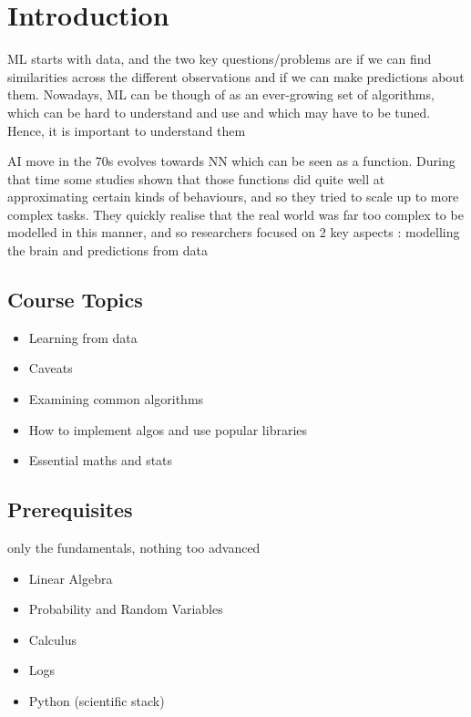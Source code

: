 \section{Introduction}



\par{ML starts with data, and the two key questions/problems are if we can find similarities across the different observations and if we can make predictions about them. Nowadays, ML can be though of as an ever-growing set of algorithms, which can be hard to understand and use and which may have to be tuned. Hence, it is important to understand them}

\par{AI move in the 70s evolves towards NN which can be seen as a function. During that time some studies shown that those functions did quite well at approximating certain kinds of behaviours, and so they tried to scale up to more complex tasks. They quickly realise that the real world was far too complex to be modelled in this manner, and so researchers focused on 2 key aspects : modelling the brain and predictions from data}


\subsection{Course Topics}

	\begin{itemize}
		\item Learning from data
		\item Caveats
		\item Examining common algorithms
		\item How to implement algos and use popular libraries
		\item Essential maths and stats
	\end{itemize}

\subsection{Prerequisites}
	\par{only the fundamentals, nothing too advanced}

	\begin{itemize}
		\item Linear Algebra 
		\item Probability and Random Variables
		\item Calculus
		\item Logs
		\item Python (scientific stack)
	\end{itemize}



